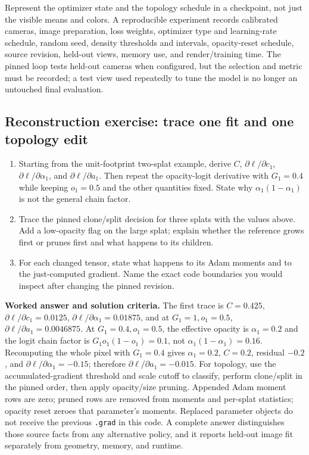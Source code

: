 Represent the optimizer state and the topology schedule in a checkpoint, not just the visible means and colors. A reproducible experiment records calibrated cameras, image preparation, loss weights, optimizer type and learning-rate schedule, random seed, density thresholds and intervals, opacity-reset schedule, source revision, held-out views, memory use, and render/training time. The pinned loop tests held-out cameras when configured, but the selection and metric must be recorded; a test view used repeatedly to tune the model is no longer an untouched final evaluation.

\subsection{Reconstruction exercise: trace one fit and one topology edit}\label{04-visual-computing-ii-ch039-reconstruction-exercise-trace-one-fit-and-one-topology-edit}

\begin{enumerate}
\def\labelenumi{\arabic{enumi}.}
\tightlist
\item
  Starting from the unit-footprint two-splat example, derive \(C\), \(\partial\ell/\partial c_1\), \(\partial\ell/\partial\alpha_1\), and \(\partial\ell/\partial a_1\). Then repeat the opacity-logit derivative with \(G_1=0.4\) while keeping \(o_1=0.5\) and the other quantities fixed. State why \(\alpha_1(1-\alpha_1)\) is not the general chain factor.
\item
  Trace the pinned clone/split decision for three splats with the values above. Add a low-opacity flag on the large splat; explain whether the reference grows first or prunes first and what happens to its children.
\item
  For each changed tensor, state what happens to its Adam moments and to the just-computed gradient. Name the exact code boundaries you would inspect after changing the pinned revision.
\end{enumerate}

\textbf{Worked answer and solution criteria.} The first trace is \(C=0.425\), \(\partial\ell/\partial c_1=0.0125\), \(\partial\ell/\partial\alpha_1=0.01875\), and at \(G_1=1,o_1=0.5\), \(\partial\ell/\partial a_1=0.0046875\). At \(G_1=0.4,o_1=0.5\), the effective opacity is \(\alpha_1=0.2\) and the logit chain factor is \(G_1o_1(1-o_1)=0.1\), not \(\alpha_1(1-\alpha_1)=0.16\). Recomputing the whole pixel with \(G_1=0.4\) gives \(\alpha_1=0.2\), \(C=0.2\), residual \(-0.2\), and \(\partial\ell/\partial\alpha_1=-0.15\); therefore \(\partial\ell/\partial a_1=-0.015\). For topology, use the accumulated-gradient threshold and scale cutoff to classify, perform clone/split in the pinned order, then apply opacity/size pruning. Appended Adam moment rows are zero; pruned rows are removed from moments and per-splat statistics; opacity reset zeroes that parameter's moments. Replaced parameter objects do not receive the previous \texttt{.grad} in this code. A complete answer distinguishes those source facts from any alternative policy, and it reports held-out image fit separately from geometry, memory, and runtime.


